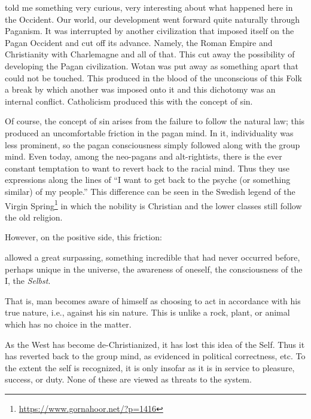 \begin{quotex}
[Jung] told me something very curious, very interesting about what happened here in the Occident. Our world, our development went forward quite naturally through Paganism. It was interrupted by another civilization that imposed itself on the Pagan Occident and cut off its advance. Namely, the Roman Empire and Christianity with Charlemagne and all of that. This cut away the possibility of developing the Pagan civilization. Wotan was put away as something apart that could not be touched. This produced in the blood of the unconscious of this Folk a break by which another was imposed onto it and this dichotomy was an internal conflict. Catholicism produced this with the concept of sin.

\end{quotex}
Of course, the concept of sin arises from the failure to follow the natural law; this produced an uncomfortable friction in the pagan mind. In it, individuality was less prominent, so the pagan consciousness simply followed along with the group mind. Even today, among the neo-pagans and alt-rightists, there is the ever constant temptation to want to revert back to the racial mind. Thus they use expressions along the lines of “I want to get back to the psyche (or something similar) of my people.” This difference can be seen in the Swedish legend of the Virgin Spring\footnote{\url{https://www.gornahoor.net/?p=1416}} in which the nobility is Christian and the lower classes still follow the old religion.

However, on the positive side, this friction:

\begin{quotex}
allowed a great surpassing, something incredible that had never occurred before, perhaps unique in the universe, the awareness of oneself, the consciousness of the I, the \emph{Selbst}. 

\end{quotex}
That is, man becomes aware of himself as choosing to act in accordance with his true nature, i.e., against his sin nature. This is unlike a rock, plant, or animal which has no choice in the matter.

As the West has become de-Christianized, it has lost this idea of the Self. Thus it has reverted back to the group mind, as evidenced in political correctness, etc. To the extent the self is recognized, it is only insofar as it is in service to pleasure, success, or duty. None of these are viewed as threats to the system.

